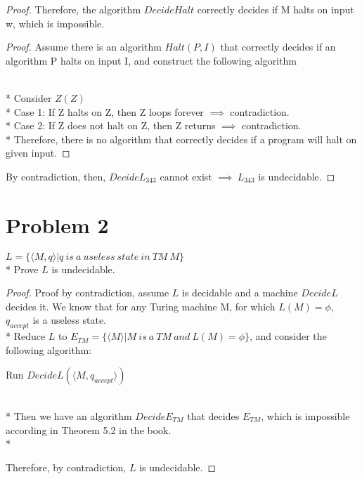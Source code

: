 \documentclass{article}
\begin{document}
\begin{proof}
        Therefore, the algorithm $DecideHalt$ correctly decides if M halts on input w, which is impossible.
        \begin{proof}
            Assume there is an algorithm $Halt(P,I)$ that correctly decides if an algorithm P halts on input I,
            and construct the following algorithm
            \begin{algorithm}
                \DontPrintSemicolon
                \caption{$Z$}
                \Else{
                    \Return\;
                }

            \end{algorithm}\\*
            Consider $Z(Z)$\\*
            Case 1: If Z halts on Z, then Z loops forever $\implies$ contradiction.\\*
            Case 2: If Z does not halt on Z, then Z returns $\implies$ contradiction.\\*
            Therefore, there is no algorithm that correctly decides if a program will halt on given input.
        \end{proof}

        By contradiction, then, $DecideL_{343}$ cannot exist $\implies\ L_{343}$ is undecidable.
    \end{proof}
    \newpage
    \section*{Problem 2}
    $L=\{\langle M,q \rangle|q\ is\ a\ useless\ state\ in\ TM\ M \}$\\* 
    Prove $L$ is undecidable.
    \begin{proof}
        Proof by contradiction, assume $L$ is decidable and a machine $DecideL$ decides it.
        We know that for any Turing machine M, for which $L(M)=\phi$, $q_{accept}$ is a useless state.\\*
        Reduce $L$ to $E_{TM}=\{\langle M \rangle |M\ is\ a\ TM\ and\ L(M)=\phi \}$, and consider the following algorithm:
        \begin{algorithm}
            \caption{$ DecideE_{TM} $}
            Run $DecideL(\langle M, q_{accept} \rangle )$ \;
        \end{algorithm}\\*
        Then we have an algorithm $DecideE_{TM}$ that decides $E_{TM}$, which is impossible according in Theorem 5.2 in the book.\\*

        Therefore, by contradiction, $L$ is undecidable.

    \end{proof}
\end{document}
